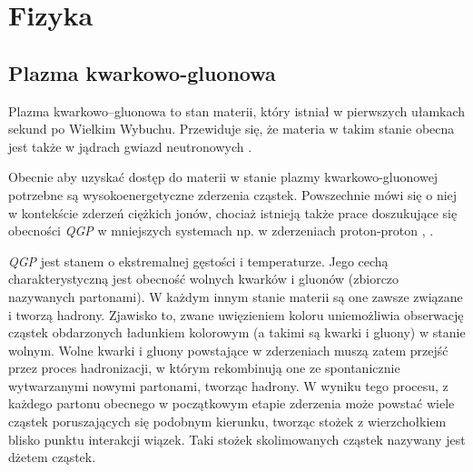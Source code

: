 \section{Fizyka}
\subsection{Plazma kwarkowo-gluonowa}
\label{subsec:qgp}

Plazma kwarkowo--gluonowa  to stan materii, który istniał w pierwszych ułamkach sekund po Wielkim Wybuchu. Przewiduje się, że materia w takim stanie obecna jest także w jądrach gwiazd neutronowych \cite{Andronic:2014zha}.

Obecnie aby uzyskać dostęp do materii w stanie plazmy kwarkowo-gluonowej potrzebne są wysokoenergetyczne zderzenia cząstek. Powszechnie mówi się o niej w kontekście zderzeń ciężkich jonów, chociaż istnieją także prace doszukujące się obecności \textit{QGP} w mniejszych systemach np. w zderzeniach proton-proton \cite{Khachatryan:2016txc}, \cite{ALICE:2017jyt}. 

\textit{QGP} jest stanem o ekstremalnej gęstości i temperaturze. Jego cechą charakterystyczną jest obecność wolnych kwarków i gluonów (zbiorczo nazywanych partonami). 
W każdym innym stanie materii są one zawsze związane i tworzą hadrony. Zjawisko to, zwane uwięzieniem koloru  uniemożliwia obserwację cząstek obdarzonych ładunkiem kolorowym (a takimi są kwarki i gluony) w stanie wolnym.
Wolne kwarki i gluony powstające w zderzeniach muszą zatem przejść przez proces hadronizacji, w którym  rekombinują one ze spontanicznie wytwarzanymi nowymi partonami, tworząc hadrony. W wyniku tego procesu, z każdego partonu obecnego w początkowym etapie zderzenia może powstać wiele cząstek poruszających się podobnym kierunku, tworząc stożek z wierzchołkiem blisko punktu interakcji wiązek. Taki stożek skolimowanych cząstek nazywany jest dżetem cząstek.




